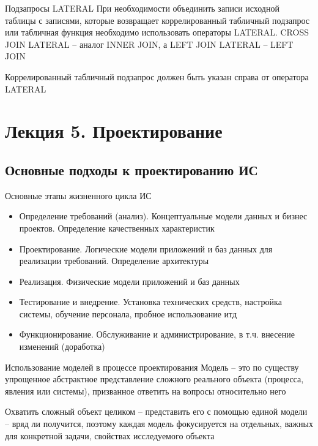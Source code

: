 \documentclass[12pt]{article}
\begin{document}
\begin{defin}{Подзапросы LATERAL}
    При необходимости объединить записи исходной таблицы с записями, которые возвращает коррелированный табличный подзапрос или табличная функция необходимо использовать операторы LATERAL. CROSS JOIN LATERAL -- аналог INNER JOIN, а LEFT JOIN LATERAL -- LEFT JOIN

    Коррелированный табличный подзапрос должен быть указан справа от оператора LATERAL
\end{defin}

\newpage 

\section{Лекция 5. Проектирование}

\subsection{Основные подходы к проектированию ИС}

\begin{nota}{Основные этапы жизненного цикла ИС}
    \begin{itemize}
        \item Определение требований (анализ). Концептуальные модели данных и бизнес проектов. Определение качественных характеристик
        \item Проектирование. Логические модели приложений и баз данных для реализации требований. Определение архитектуры 
        \item Реализация. Физические модели приложений и баз данных 
        \item Тестирование и внедрение. Установка технических средств, настройка системы, обучение персонала, пробное использование итд 
        \item Функционирование. Обслуживание и администрирование, в т.ч. внесение изменений (доработка)
    \end{itemize}
\end{nota}

\begin{nota}{Использование моделей в процессе проектирования}
    Модель -- это по существу упрощенное абстрактное представление сложного реального объекта (процесса, явления или системы), призванное ответить на вопросы относительно него 

    Охватить сложный объект целиком -- представить его с помощью единой модели -- вряд ли получится, поэтому каждая модель фокусируется на отдельных, важных для конкретной задачи, свойствах исследуемого объекта 
\end{nota}
\end{document}
